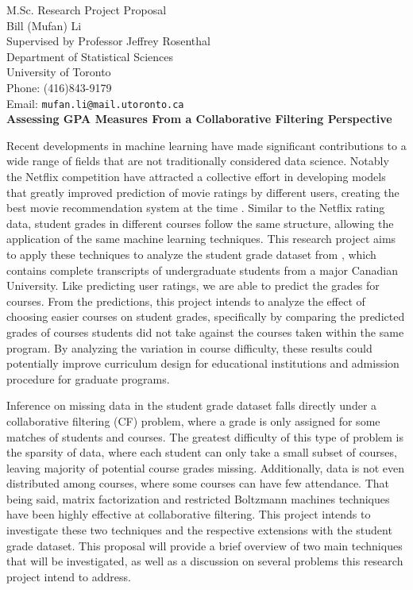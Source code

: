 \documentclass[12pt]{article}
\begin{document}
\begin{center}
M.Sc. Research Project Proposal \\
Bill (Mufan) Li \\
Supervised by Professor Jeffrey Rosenthal \\
Department of Statistical Sciences \\
University of Toronto \\
Phone: (416)843-9179\\
Email: {\tt mufan.li@mail.utoronto.ca}\\
\bigskip\large
{\bf Assessing GPA Measures From a Collaborative Filtering
Perspective}
\end{center}

Recent developments in machine learning have made significant 
contributions to a wide range of fields that are not 
traditionally considered data science.
Notably the Netflix competition have attracted a collective
effort in developing models that greatly improved prediction
of movie ratings by different users,
creating the best movie recommendation system at the time \cite{FeHeKh12}.
Similar to the Netflix rating data,
student grades in different courses follow the same structure,
allowing the application of the same machine learning techniques.
This research project aims to apply these
techniques to analyze the student grade dataset from \cite{BaRoYo14},
which contains complete transcripts of undergraduate students
from a major Canadian University.
Like predicting user ratings,
we are able to predict the grades for courses.
From the predictions, this project intends to analyze
the effect of choosing easier courses on student grades,
specifically by comparing the predicted grades of courses
students did not take against the courses taken 
within the same program.
By analyzing the variation in course difficulty,
these results could potentially improve curriculum design 
for educational institutions and admission procedure for
graduate programs.

Inference on missing data in the
student grade dataset falls directly under a collaborative
filtering (CF) problem, where a grade is only assigned for
some matches of students and courses.
The greatest difficulty of this type of problem is the sparsity
of data, where each student can only take a small subset of 
courses, leaving majority of potential course grades missing.
Additionally, data is not even distributed among courses, 
where some courses can have few attendance.
That being said, matrix factorization and restricted Boltzmann
machines techniques have been highly effective at collaborative filtering.
This project intends to investigate these two techniques and
the respective extensions with the student grade dataset.
This proposal will provide a brief overview of 
two main techniques that will be investigated,
as well as a discussion on several problems
this research project intend to address.
\end{document}
